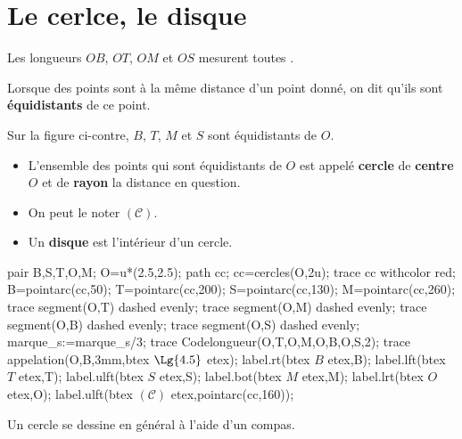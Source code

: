 \section{Le cerlce, le disque}
\begin{minipage}{0.7\linewidth}
    Les longueurs $OB$, $OT$, $OM$ et $OS$ mesurent toutes .
    
    \begin{definition}
        Lorsque des points sont à la même distance d'un point donné, on dit qu'ils sont {\bfseries équidistants} de ce point.
    \end{definition}

    \begin{remarque}
        Sur la figure ci-contre, $B$, $T$, $M$ et $S$ sont équidistants de $O$.
    \end{remarque}

    \begin{definition}
        \begin{itemize}
            \item L'ensemble des points qui sont équidistants de $O$ est appelé {\red\bfseries cercle} de {\bfseries centre} $O$ et de {\bfseries rayon} la distance en question.
            \item On peut le noter $(\mathscr C)$.
            \item Un {\bfseries disque} est l'intérieur d'un cercle.
        \end{itemize}
    \end{definition}
\end{minipage}
\begin{minipage}{0.3\linewidth}
    \begin{Geometrie}[CoinHD={(5u,5u)}]
        pair B,S,T,O,M;
        O=u*(2.5,2.5);
        path cc;
        cc=cercles(O,2u);
        trace cc withcolor red;
        B=pointarc(cc,50);
        T=pointarc(cc,200);
        S=pointarc(cc,130);
        M=pointarc(cc,260);
        trace segment(O,T) dashed evenly;
        trace segment(O,M) dashed evenly;
        trace segment(O,B) dashed evenly;
        trace segment(O,S) dashed evenly;
        marque_s:=marque_s/3;
        trace Codelongueur(O,T,O,M,O,B,O,S,2);
        trace appelation(O,B,3mm,btex $\Lg{4.5}$ etex);
        label.rt(btex $B$ etex,B);
        label.lft(btex $T$ etex,T);
        label.ulft(btex $S$ etex,S);
        label.bot(btex $M$ etex,M);
        label.lrt(btex $O$ etex,O);
        label.ulft(btex $(\mathscr C)$ etex,pointarc(cc,160));
    \end{Geometrie} 
\end{minipage}
\begin{remarque}
    Un cercle se dessine en général à l'aide d'un compas.
\end{remarque}

